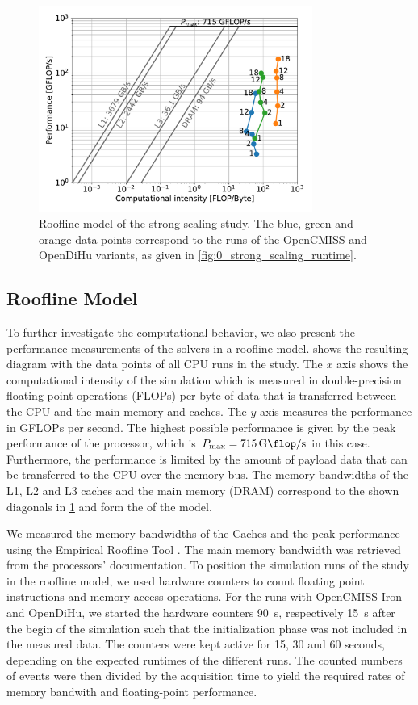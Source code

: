 \begin{figure}[H]
  \centering%
  \includegraphics[width=0.8\textwidth]{images/results/studies/0_roofline.pdf}%
  \caption{Roofline model of the strong scaling study. The blue, green and orange data points correspond to the runs of the OpenCMISS and OpenDiHu variants, as given in \cref{fig:0_strong_scaling_runtime}.}%
  \label{fig:0_roofline}%
\end{figure}%

\subsection{Roofline Model}\label{sec:roofline_model}
To further investigate the computational behavior, we also present the performance measurements of the solvers in a roofline model. 
 shows the resulting diagram with the data points of all CPU runs in the study. The $x$ axis shows the computational intensity of the simulation which is measured in double-precision floating-point operations (FLOPs) per byte of data that is transferred between the CPU and the main memory and caches. The $y$ axis measures the performance in GFLOPs per second. The highest possible performance is given by the peak performance of the processor, which is $P_\text{max} = \SI{715}{\giga\flop\per\second}$ in this case. Furthermore, the performance is limited by the amount of payload data that can be transferred to the CPU over the memory bus. The memory bandwidths of the L1, L2 and L3 caches and the main memory (DRAM) correspond to the shown diagonals in \cref{fig:0_roofline} and form the  of the model.

We measured the memory bandwidths of the Caches and the peak performance using the Empirical Roofline Tool \cite{ert}. The main memory bandwidth was retrieved from the processors' documentation.
To position the simulation runs of the study in the roofline model, we used hardware counters to count floating point instructions and memory access operations.
For the runs with OpenCMISS Iron and OpenDiHu, we started the hardware counters \SI{90}{\second}, respectively \SI{15}{\second} after the begin of the simulation such that the initialization phase was not included in the measured data. The counters were kept active for 15, 30 and 60 seconds, depending on the expected runtimes of the different runs. The counted numbers of events were then divided by the acquisition time to yield the required rates of memory bandwith and floating-point performance.

